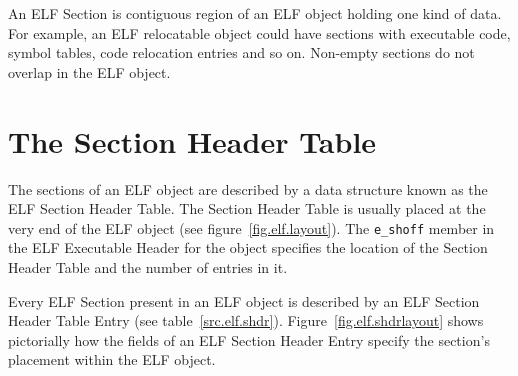 \documentclass[a4paper,pdftex]{book}
\newcommand{\parameter}[1]{\texttt{#1}}
\newcommand{\elfdatastructure}[1]{\textsf{#1}}
\begin{document}
An ELF \elfdatastructure{Section} is contiguous region
of an ELF object holding one kind of data. For example, an ELF
relocatable object could have sections with executable code, symbol
tables, code relocation entries and so on.
Non-empty sections do not overlap in the ELF object.

\section{The Section Header Table}

The sections of an ELF object are described by a data structure known
as the ELF \elfdatastructure{Section Header Table}.  The
\elfdatastructure{Section Header Table} is usually placed at the very
end of the ELF object (see figure~\vref{fig.elf.layout}).  The
\parameter{e\_shoff} member in the ELF \elfdatastructure{Executable
  Header} for the object specifies the location of the
\elfdatastructure{Section Header Table} and the number of entries in
it.

Every ELF \elfdatastructure{Section} present in an ELF object is
described by an ELF \elfdatastructure{Section Header Table Entry} (see
table~\vref{src.elf.shdr}). Figure~\vref{fig.elf.shdrlayout} shows
pictorially how the fields of an ELF \elfdatastructure{Section Header
  Entry} specify the section's placement within the ELF
object.
\end{document}
